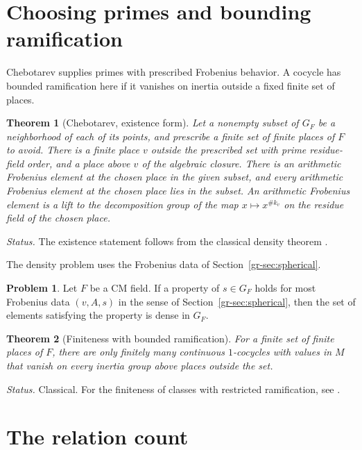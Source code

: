 \documentclass[reqno]{amsart}
\theoremstyle{definition}
\newtheorem{problem}{Problem}[section]
\theoremstyle{plain}
\newtheorem{theorem}{Theorem}[section]
\begin{document}
\section{Choosing primes and bounding ramification}\label{sec:primes}

Chebotarev supplies primes with prescribed Frobenius behavior.
A cocycle has bounded ramification here if it vanishes on inertia outside a fixed finite set of places.

\begin{theorem}[Chebotarev, existence form]\label{thm:chebotarev}
Let a nonempty subset of \(G_F\) be a neighborhood of each of its
points, and prescribe a finite set of finite places of \(F\) to avoid.
There is a finite place \(v\) outside the prescribed set with prime
residue-field order, and a place above \(v\) of the algebraic closure.
There is an arithmetic Frobenius element at the chosen place in the
given subset, and every arithmetic Frobenius element at the chosen
place lies in the subset.  An arithmetic Frobenius element is a lift
to the decomposition group of the map \(x\mapsto x^{\#k_v}\) on the
residue field of the chosen place.
\end{theorem}

\emph{Status.} The existence statement follows from the classical density
theorem \cite[Ch.~V, Thm.~3.23]{CFT}.

The density problem uses the Frobenius data of Section~\ref{gr-sec:spherical}.

\begin{problem}\label{pr:most}
Let \(F\) be a CM field.  If a property of \(s\in G_F\) holds for
most Frobenius data \((v,A,s)\) in the sense of
Section~\ref{gr-sec:spherical}, then the set of elements satisfying
the property is dense in \(G_F\).
\end{problem}

\begin{theorem}[Finiteness with bounded ramification]\label{thm:finiteness}
For a finite set of finite places of \(F\), there are only finitely
many continuous \(1\)-cocycles with values in \(M\) that vanish on
every inertia group above places outside the set.
\end{theorem}

\emph{Status.} Classical.  For the finiteness of classes with restricted
ramification, see \cite[Ch.~I, Cor.~4.15]{ADT}.

\section{The relation count}\label{sec:count}
\end{document}
